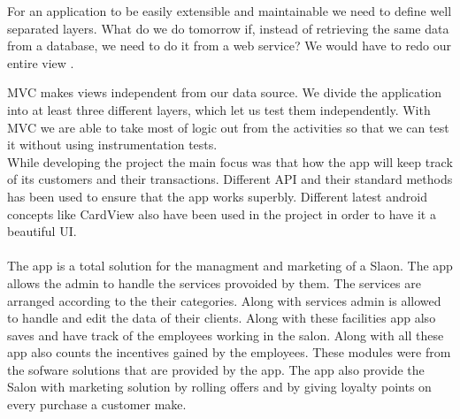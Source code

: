 For an application to be easily extensible and maintainable we need to define well separated layers. What do we do tomorrow if, instead of retrieving the same data from a database, we need to do it from a web service? We would have to redo our entire view .

MVC makes views independent from our data source. We divide the application into at least three different layers, which let us test them independently. With MVC we are able to take most of logic out from the activities so that we can test it without using instrumentation tests.\\

While developing the project the main focus was that how the app will keep track of its customers and their transactions. Different API and their standard methods has been used to ensure that the app works superbly. Different latest android concepts like CardView also have been used in the project in order to have it a beautiful UI.\\
\\
The app is a total solution for the managment and marketing of a Slaon. The app allows the admin to handle the services provoided by them. The services are arranged according to the their categories. Along with services admin is allowed to handle and edit the data of their clients. Along with these facilities app also saves and have track of the employees working in the salon. Along with all these app also counts the incentives gained by the employees. These modules were from the sofware solutions that are provided by the app. The app also provide the Salon with marketing solution by rolling offers and by giving loyalty points on every purchase a customer make. 
\\

